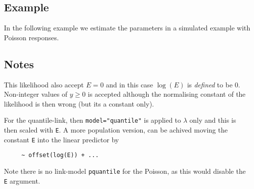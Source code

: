 \documentclass[a4paper,11pt]{article}
\begin{document}
\subsection*{Example}

In the following example we estimate the parameters in a simulated
example with Poisson responses.


\subsection*{Notes}

This likelihood also accept $E=0$ and in this case $\log(E)$ is
\emph{defined} to be $0$. Non-integer values of $y \ge 0$ is accepted
although the normalising constant of the likelihood is then wrong (but
its a constant only).

For the quantile-link, then \texttt{model="quantile"} is applied to
$\lambda$ only and this is then scaled with \texttt{E}. A more
population version, can be achived moving the constant \texttt{E} into
the linear predictor by 
\begin{verbatim}
     ~ offset(log(E)) + ...
\end{verbatim}
Note there is no link-model \texttt{pquantile} for the Poisson, as
this would disable the \texttt{E} argument.
\end{document}
